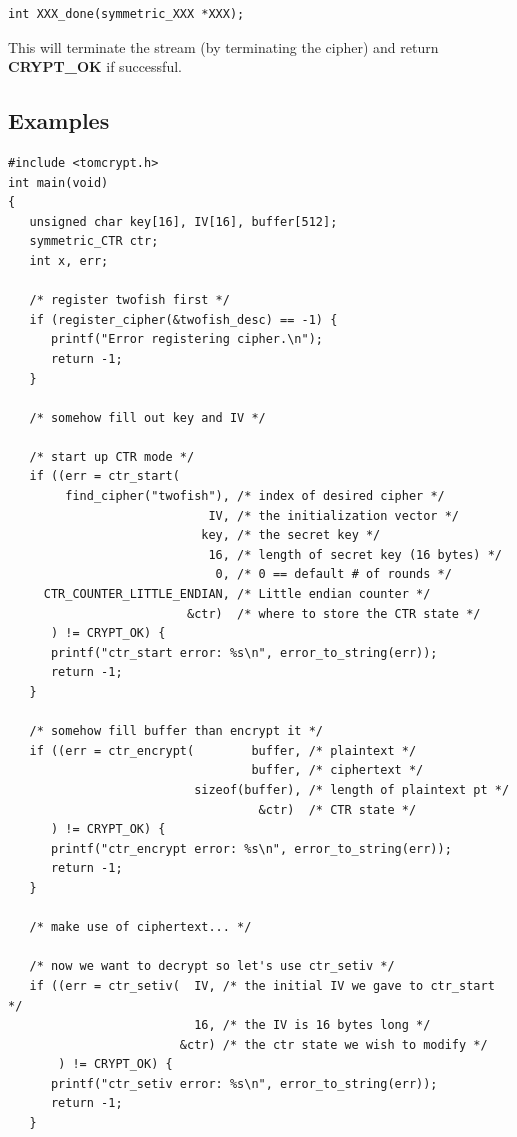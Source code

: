 \documentclass[synpaper]{book}
\begin{document}
  
\begin{verbatim}
int XXX_done(symmetric_XXX *XXX);
\end{verbatim}

This will terminate the stream (by terminating the cipher) and return \textbf{CRYPT\_OK} if successful.

\newpage
\subsection{Examples}
\begin{small}
\begin{verbatim}
#include <tomcrypt.h>
int main(void)
{
   unsigned char key[16], IV[16], buffer[512];
   symmetric_CTR ctr;
   int x, err;

   /* register twofish first */
   if (register_cipher(&twofish_desc) == -1) {
      printf("Error registering cipher.\n");
      return -1;
   }

   /* somehow fill out key and IV */

   /* start up CTR mode */
   if ((err = ctr_start(
        find_cipher("twofish"), /* index of desired cipher */
                            IV, /* the initialization vector */
                           key, /* the secret key */
                            16, /* length of secret key (16 bytes) */
                             0, /* 0 == default # of rounds */
     CTR_COUNTER_LITTLE_ENDIAN, /* Little endian counter */
                         &ctr)  /* where to store the CTR state */
      ) != CRYPT_OK) {
      printf("ctr_start error: %s\n", error_to_string(err));
      return -1;
   }

   /* somehow fill buffer than encrypt it */
   if ((err = ctr_encrypt(        buffer, /* plaintext */
                                  buffer, /* ciphertext */
                          sizeof(buffer), /* length of plaintext pt */
                                   &ctr)  /* CTR state */
      ) != CRYPT_OK) {
      printf("ctr_encrypt error: %s\n", error_to_string(err));
      return -1;
   }

   /* make use of ciphertext... */

   /* now we want to decrypt so let's use ctr_setiv */
   if ((err = ctr_setiv(  IV, /* the initial IV we gave to ctr_start */
                          16, /* the IV is 16 bytes long */
                        &ctr) /* the ctr state we wish to modify */
       ) != CRYPT_OK) {
      printf("ctr_setiv error: %s\n", error_to_string(err));
      return -1;
   }


\end{verbatim}
\end{small}
\end{document}
